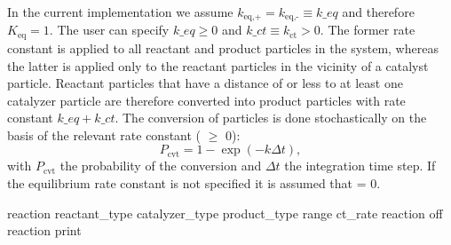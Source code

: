 In the current \es implementation we assume $k_{\text{eq,+}} =
k_{\text{eq,-}} \equiv k\_eq$ and therefore $K_{\text{eq}}=1$. The
user can specify $k\_eq \ge 0$ and $k\_ct \equiv k_{\text{ct}} >
0$. The former rate constant is applied to all reactant and product
particles in the system, whereas the latter is applied only to the
reactant particles in the vicinity of a catalyst particle. Reactant
particles that have a distance of  or less to at least one
catalyzer particle are therefore converted into product particles with
rate constant $k\_eq + k\_ct$. The conversion of particles is done
stochastically on the basis of the relevant rate constant (
$\ge$ 0):
\begin{equation}
\label{eq:rate} P_{\text{cvt}} = 1 - \exp \left( - k  \Delta t  \right) ,
\end{equation}
with $P_{\text{cvt}}$ the probability of the conversion and $\Delta t$
the integration time step. If the equilibrium rate constant is not
specified it is assumed that  = 0.

\begin{pysyntax}
\end{pysyntax}

\begin{essyntax}
 reaction reactant_type  catalyzer_type  
product_type  range  ct_rate 
  
 reaction off
 reaction print
\begin{features}
\end{features}
\end{essyntax}

